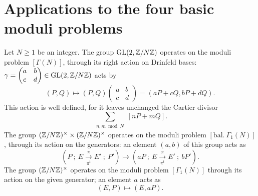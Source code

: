 \section{Applications to the four basic moduli problems}
\label{sec:7.4}

\kmitem\label{item:7.4.1}
Let $N \ge 1$ be an integer. The group $\operatorname{GL}(2,\mathbb{Z}/N\mathbb{Z})$ operates on the moduli problem $[\Gamma(N)]$, through its right action on Drinfeld bases: $\gamma = \begin{pmatrix} a & b \\ c & d \end{pmatrix} \in \operatorname{GL}(2,\mathbb{Z}/N\mathbb{Z})$ acts by
\[
(P, Q) \mapsto (P, Q) \begin{pmatrix} a & b \\ c & d \end{pmatrix} = (aP + cQ, bP + dQ) .
\]
This action is well defined, for it leaves unchanged the Cartier divisor
\[
\sum_{\substack{n, m \bmod N}} [nP + mQ] .
\]
The group $(\mathbb{Z}/N\mathbb{Z})^\times \times (\mathbb{Z}/N\mathbb{Z})^\times$ operates on the moduli problem $[\mathrm{bal.}\ \Gamma_1(N)]$, through its action on the generators: an element $(a,b)$ of this group acts as
\[
\left( P\ ;\ E \xrightarrow[\pi^t]{\pi} E'\ ;\ P' \right) \mapsto \left( aP\ ;\ E \xrightarrow[\pi^t]{\pi} E'\ ;\ bP' \right) .
\]
The group $(\mathbb{Z}/N\mathbb{Z})^\times$ operates on the moduli problem $[\Gamma_1(N)]$ through its action on the given generator; an element $a$ acts as
\[
(E, P) \mapsto (E, aP) .
\]

